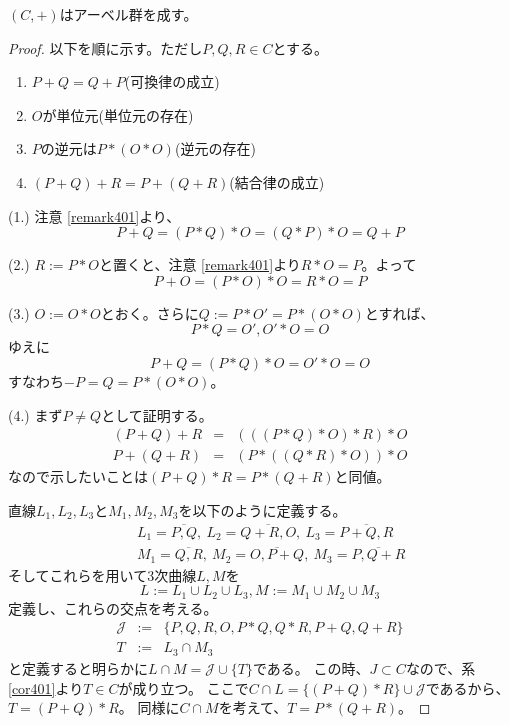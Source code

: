 \documentclass[a4paper]{jsarticle}
\begin{document}
        \begin{Them}
            $(C,+)$はアーベル群を成す。
        \end{Them}
        \begin{proof}
            以下を順に示す。ただし$P, Q, R \in C$とする。
            \begin{enumerate}
                \item $P+Q=Q+P$(可換律の成立)
                \item $O$が単位元(単位元の存在)
                \item $P$の逆元は$P \ast (O \ast O)$(逆元の存在)
                \item $(P+Q)+R=P+(Q+R)$(結合律の成立)
            \end{enumerate}

            (1.)
            注意 \ref{remark401}より、
            \[ P+Q=(P \ast Q) \ast O=(Q \ast P) \ast O=Q+P \]

            (2.)
            $R:=P \ast O$と置くと、注意 \ref{remark401}より$R \ast O=P$。よって
            \[ P+O=(P \ast O) \ast O=R \ast O=P \]

            (3.)
            $O:=O \ast O$とおく。さらに$Q:=P \ast O'=P \ast (O \ast O)$とすれば、
            \[ P \ast Q = O', O' \ast O=O \]
            ゆえに
            \[ P+Q=(P \ast Q) \ast O=O' \ast O=O \]
            すなわち$-P=Q=P \ast (O \ast O)$。

            (4.)
            まず$P \neq Q$として証明する。
            \begin{eqnarray*}
                (P+Q)+R &=& (((P \ast Q) \ast O) \ast R) \ast O \\
                P+(Q+R) &=& (P \ast ((Q \ast R) \ast O)) \ast O
            \end{eqnarray*}
            なので示したいことは$(P+Q) \ast R=P \ast (Q+R)$と同値。

            直線$L_1, L_2, L_3$と$M_1, M_2, M_3$を以下のように定義する。
            \begin{eqnarray*}
                &{}&L_1=\overline{P,Q},~ L_2=\overline{Q+R,O},~ L_3=\overline{P+Q,R} \\
                &{}&M_1=\overline{Q,R},~ M_2=\overline{O,P+Q},~ M_3=\overline{P,Q+R}
            \end{eqnarray*}
            そしてこれらを用いて3次曲線$L, M$を
            \[ L:=L_1 \cup L_2 \cup L_3, M:=M_1 \cup M_2 \cup M_3 \]
            定義し、これらの交点を考える。
            \begin{eqnarray*}
                \mathcal{J} &:=& \{P,Q,R,O, P \ast Q, Q \ast R, P+Q, Q+R \} \\
                T &:=& L_3 \cap M_3
            \end{eqnarray*}
            と定義すると明らかに$L \cap M = \mathcal{J} \cup \{T\}$である。
            この時、$J \subset C$なので、系 \ref{cor401}より$T \in C$が成り立つ。
            ここで$C \cap L= \{(P+Q) \ast R \} \cup \mathcal{J}$であるから、$T=(P+Q) \ast R$。
            同様に$C \cap M$を考えて、$T=P \ast (Q+R)$。


\end{proof}
\end{document}
